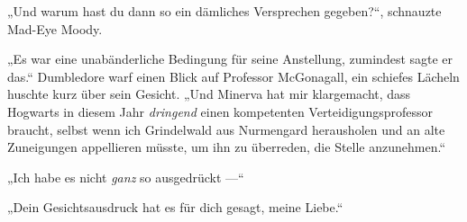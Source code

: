 „Und warum hast du dann so ein dämliches Versprechen gegeben?“, schnauzte Mad-Eye Moody.

„Es war eine unabänderliche Bedingung für seine Anstellung, zumindest sagte er das.“ Dumbledore warf einen Blick auf Professor McGonagall, ein schiefes Lächeln huschte kurz über sein Gesicht.
„Und Minerva hat mir klargemacht, dass Hogwarts in diesem Jahr \emph{dringend} einen kompetenten Verteidigungsprofessor braucht, selbst wenn ich Grindelwald aus Nurmengard herausholen und an alte Zuneigungen appellieren müsste, um ihn zu überreden, die Stelle anzunehmen.“

„Ich habe es nicht \emph{ganz} so ausgedrückt —“

„Dein Gesichtsausdruck hat es für dich gesagt, meine Liebe.“

